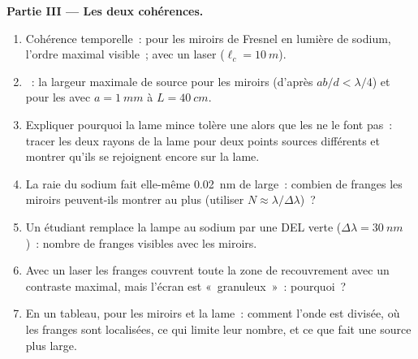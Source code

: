 \begin{problem}
\medskip
\noindent\textbf{Partie III --- Les deux cohérences.}
\begin{enumerate}[resume]
  \item Cohérence temporelle~: pour les miroirs de Fresnel en lumière de sodium,
        l'ordre maximal visible~; avec un laser ($\ell_c = \qty{10}{m}$).
  \item {}~: la largeur maximale de source pour les miroirs
        (d'après $ab/d < \lambda/4$) et pour les  avec $a = \qty{1}{mm}$ à
        $L = \qty{40}{cm}$.
  \item Expliquer pourquoi la lame mince tolère une  alors que
        les  ne le font pas~: tracer les deux rayons de la lame pour deux
        points sources différents et montrer qu'ils se rejoignent encore sur la lame.
  \item La raie du sodium fait elle-même \qty{0.02}{nm} de large~: combien de franges
        les miroirs peuvent-ils montrer au plus (utiliser $N \approx \lambda/\Delta\lambda$)~?
  \item Un étudiant remplace la lampe au sodium par une DEL verte ($\Delta\lambda =
        \qty{30}{nm}$)~: nombre de franges visibles avec les miroirs.
  \item Avec un laser les franges couvrent toute la zone de recouvrement
        avec un contraste maximal, mais l'écran est «~granuleux~»~: pourquoi~?
  \item En un tableau, pour les miroirs et la lame~: comment l'onde est
        divisée, où les franges sont localisées, ce qui limite leur
        nombre, et ce que fait une source plus large.
\end{enumerate}
\end{problem}

